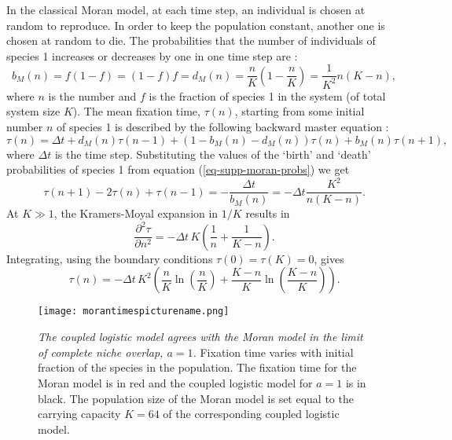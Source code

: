 In the classical Moran model, at each time step, an individual is chosen at random to reproduce. In order to keep the population constant, another one is chosen at random to die. %
The probabilities that the number of individuals of species 1 increases or decreases by one  in one time step are \cite{Moran1962}:
\begin{equation}
b_{M}(n) = f(1-f) = (1-f)f = d_{M}(n) = \frac{n}{K}\left(1-\frac{n}{K}\right) = \frac{1}{K^2}n(K-n),
\label{eq-supp-moran-probs}
\end{equation}
where $n$ is the number and $f$ is the fraction of species 1 in the system (of total system size $K$). 
The mean fixation time, $\tau(n)$, starting from some initial number $n$ of species 1 is described by the following backward master equation \cite{Nisbet1982}:
\begin{equation*}
\tau(n) = \Delta t + d_{M}(n)\tau(n-1) + \left(1-b_{M}(n)-d_{M}(n)\right)\tau(n) + b_{M}(n)\tau(n+1),
\end{equation*}
where $\Delta t$ is the time step. 
Substituting the values of the `birth' and `death' probabilities of species 1 from equation (\ref{eq-supp-moran-probs}) we get
\begin{equation*}
\tau(n+1) - 2\tau(n) + \tau(n-1) = -\frac{\Delta t}{b_{M}(n)} = -\Delta t\frac{K^2}{n(K-n)}.
\end{equation*}
At $K\gg 1$, the Kramers-Moyal expansion in $1/K$ results in
\begin{equation*}
\frac{\partial^2\tau}{\partial n^2} = -\Delta t\,K\left(\frac{1}{n}+\frac{1}{K-n}\right).
\end{equation*}
Integrating, using the boundary conditions  $\tau(0) = \tau(K)=0$, gives
\begin{equation}
\tau(n) = -\Delta t\,K^2\left(\frac{n}{K}\ln\left(\frac{n}{K}\right)+\frac{K-n}{K}\ln\left(\frac{K-n}{K}\right)\right).
\end{equation}\label{Morantime}
\begin{figure}%
	\centering
	\texttt{[image: morantimespicturename.png]}
	\caption{\emph{The coupled logistic model agrees with the Moran model in the limit of complete niche overlap, $a=1$.}  Fixation time varies with initial fraction of the species in the population. The fixation time for the Moran model is in red and the coupled logistic model for $a=1$ is in black. The population size of the Moran model is set equal to the carrying capacity $K=64$ of the corresponding coupled logistic model. 
	} \label{ICfig}
\end{figure}%

